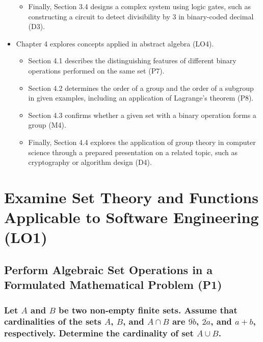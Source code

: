 \documentclass[12pt, a4paper]{report} %
\renewcommand{\sectionmark}[1]{%
  \markright{\thesection: #1}} %
\begin{document}
\begin{itemize}
\begin{itemize}
    \item Finally, Section 3.4 designs a complex system using logic gates, such as constructing a circuit to detect divisibility by 3 in binary-coded decimal (D3).
  \end{itemize}
  \item Chapter 4 explores concepts applied in abstract algebra (LO4).
  \begin{itemize}
    \item Section 4.1 describes the distinguishing features of different binary operations performed on the same set (P7).
    \item Section 4.2 determines the order of a group and the order of a subgroup in given examples, including an application of Lagrange's theorem (P8).
    \item Section 4.3 confirms whether a given set with a binary operation forms a group (M4).
    \item Finally, Section 4.4 explores the application of group theory in computer science through a prepared presentation on a related topic, such as cryptography or algorithm design (D4).
  \end{itemize}

\end{itemize}




\chapter{Examine Set Theory and Functions Applicable to Software Engineering (LO1)}

\label{chap:LO1}  %

\cite{susanna2020}
\section{Perform Algebraic Set Operations in a Formulated Mathematical Problem (P1)}
\label{sec:P1}

\subsection{Let $A$ and $B$ be two non-empty finite sets. Assume that cardinalities of the sets $A$, $B$, and $A \cap B$ are $\overline{9b}$, $\overline{2a}$, and $a + b$, respectively. Determine the cardinality of set $A \cup B$.}
\end{document}
